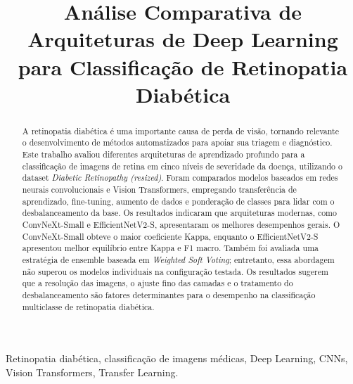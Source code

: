 \documentclass[conference]{IEEEtran}
\begin{document}
\title{An\'alise Comparativa de Arquiteturas de Deep Learning para
Classifica\c{c}\~ao de Retinopatia Diab\'etica}

\author{
}

\maketitle

\begin{abstract}
A retinopatia diab\'etica \'e uma importante causa de perda de vis\~ao,
tornando relevante o desenvolvimento de m\'etodos automatizados para
apoiar sua triagem e diagn\'ostico. Este trabalho avaliou diferentes
arquiteturas de aprendizado profundo para a classifica\c{c}\~ao de
imagens de retina em cinco n\'iveis de severidade da doen\c{c}a,
utilizando o dataset \textit{Diabetic Retinopathy (resized)}. Foram
comparados modelos baseados em redes neurais convolucionais e Vision
Transformers, empregando transfer\^encia de aprendizado, fine-tuning,
aumento de dados e pondera\c{c}\~ao de classes para lidar com o
desbalanceamento da base. Os resultados indicaram que arquiteturas
modernas, como ConvNeXt-Small e EfficientNetV2-S, apresentaram os
melhores desempenhos gerais. O ConvNeXt-Small obteve o maior coeficiente
Kappa, enquanto o EfficientNetV2-S apresentou melhor equil\'ibrio entre
Kappa e F1 macro. Tamb\'em foi avaliada uma estrat\'egia de ensemble
baseada em \textit{Weighted Soft Voting}; entretanto, essa abordagem
n\~ao superou os modelos individuais na configura\c{c}\~ao testada. Os
resultados sugerem que a resolu\c{c}\~ao das imagens, o ajuste fino das
camadas e o tratamento do desbalanceamento s\~ao fatores determinantes
para o desempenho na classifica\c{c}\~ao multiclasse de retinopatia
diab\'etica.
\end{abstract}

\begin{IEEEkeywords}
Retinopatia diab\'etica, classifica\c{c}\~ao de imagens m\'edicas,
Deep Learning, CNNs, Vision Transformers, Transfer Learning.
\end{IEEEkeywords}
\end{document}
